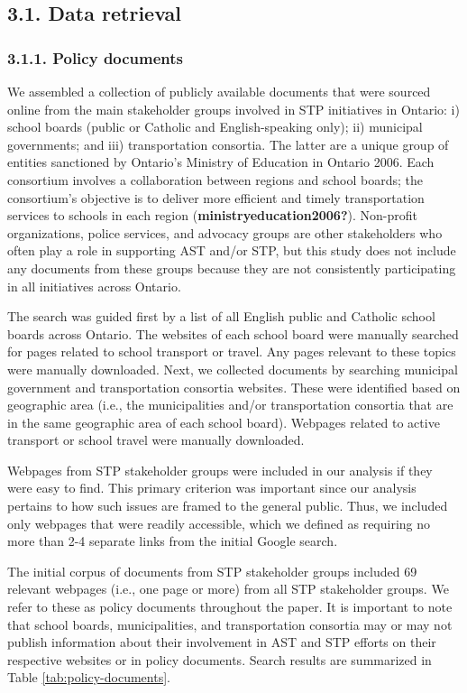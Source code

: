 \documentclass[]{elsarticle} %
\begin{document}
\hypertarget{data-retrieval}{%
\subsection{3.1. Data retrieval}\label{data-retrieval}}

\hypertarget{policy-documents}{%
\subsubsection{3.1.1. Policy documents}\label{policy-documents}}

We assembled a collection of publicly available documents that were
sourced online from the main stakeholder groups involved in STP
initiatives in Ontario: i) school boards (public or Catholic and
English-speaking only); ii) municipal governments; and iii)
transportation consortia. The latter are a unique group of entities
sanctioned by Ontario's Ministry of Education in Ontario 2006. Each
consortium involves a collaboration between regions and school boards;
the consortium's objective is to deliver more efficient and timely
transportation services to schools in each region
(\textbf{ministryeducation2006?}). Non-profit organizations, police
services, and advocacy groups are other stakeholders who often play a
role in supporting AST and/or STP, but this study does not include any
documents from these groups because they are not consistently
participating in all initiatives across Ontario.

The search was guided first by a list of all English public and Catholic
school boards across Ontario. The websites of each school board were
manually searched for pages related to school transport or travel. Any
pages relevant to these topics were manually downloaded. Next, we
collected documents by searching municipal government and transportation
consortia websites. These were identified based on geographic area
(i.e., the municipalities and/or transportation consortia that are in
the same geographic area of each school board). Webpages related to
active transport or school travel were manually downloaded.

Webpages from STP stakeholder groups were included in our analysis if
they were easy to find. This primary criterion was important since our
analysis pertains to how such issues are framed to the general public.
Thus, we included only webpages that were readily accessible, which we
defined as requiring no more than 2-4 separate links from the initial
Google search.

The initial corpus of documents from STP stakeholder groups included 69
relevant webpages (i.e., one page or more) from all STP stakeholder
groups. We refer to these as policy documents throughout the paper. It
is important to note that school boards, municipalities, and
transportation consortia may or may not publish information about their
involvement in AST and STP efforts on their respective websites or in
policy documents. Search results are summarized in Table
\ref{tab:policy-documents}.
\end{document}
